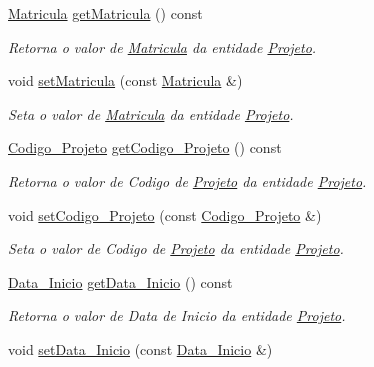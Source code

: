 \begin{DoxyCompactItemize}
\item 
\hyperlink{class_matricula}{\-Matricula} \hyperlink{class_projeto_ab5086bc8a75d77f2065639a836db28c9}{get\-Matricula} () const 
\begin{DoxyCompactList}\small\item\em \-Retorna o valor de \hyperlink{class_matricula}{\-Matricula} da entidade \hyperlink{class_projeto}{\-Projeto}. \end{DoxyCompactList}\item 
void \hyperlink{class_projeto_a2f220b68285d6acefe2b406520326969}{set\-Matricula} (const \hyperlink{class_matricula}{\-Matricula} \&)
\begin{DoxyCompactList}\small\item\em \-Seta o valor de \hyperlink{class_matricula}{\-Matricula} da entidade \hyperlink{class_projeto}{\-Projeto}. \end{DoxyCompactList}\item 
\hyperlink{class_codigo___projeto}{\-Codigo\-\_\-\-Projeto} \hyperlink{class_projeto_a1db1b38d1321c48894e74b7ac679b6e8}{get\-Codigo\-\_\-\-Projeto} () const 
\begin{DoxyCompactList}\small\item\em \-Retorna o valor de \-Codigo de \hyperlink{class_projeto}{\-Projeto} da entidade \hyperlink{class_projeto}{\-Projeto}. \end{DoxyCompactList}\item 
void \hyperlink{class_projeto_aba31c1e58bebad9aa88e4dfc41897bd5}{set\-Codigo\-\_\-\-Projeto} (const \hyperlink{class_codigo___projeto}{\-Codigo\-\_\-\-Projeto} \&)
\begin{DoxyCompactList}\small\item\em \-Seta o valor de \-Codigo de \hyperlink{class_projeto}{\-Projeto} da entidade \hyperlink{class_projeto}{\-Projeto}. \end{DoxyCompactList}\item 
\hyperlink{class_data___inicio}{\-Data\-\_\-\-Inicio} \hyperlink{class_projeto_a309461d7f136b25d6624b054c7beb3f0}{get\-Data\-\_\-\-Inicio} () const 
\begin{DoxyCompactList}\small\item\em \-Retorna o valor de \-Data de \-Inicio da entidade \hyperlink{class_projeto}{\-Projeto}. \end{DoxyCompactList}\item 
void \hyperlink{class_projeto_a699ba726969093cf54a3b1a7677c4434}{set\-Data\-\_\-\-Inicio} (const \hyperlink{class_data___inicio}{\-Data\-\_\-\-Inicio} \&)

\end{DoxyCompactItemize}
